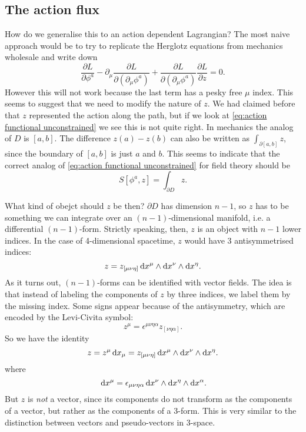 \documentclass[../main.tex]{subfiles}
\begin{document}
\subsection{The action flux}
How do we generalise this to an action dependent Lagrangian? The most naive approach would
be to try to replicate the Herglotz equations from mechanics wholesale and write down
\begin{equation*}
	\frac{\partial L}{\partial \phi^a} - \partial_\mu \frac{\partial L}{\partial
	(\partial_\mu \phi ^a)} + \frac{\partial L}{\partial(\partial_\mu \phi^a)}\frac{\partial
L}{\partial z} = 0. 
\end{equation*}
However this will not work because the last term has a pesky free \( \mu \) index. This
seems to suggest that we need to modify the nature of \( z \). We had claimed before that
\( z \) represented the action along the path, but if we look at \cref{eq:action
functional unconstrained} we see this is not quite right. In mechanics the analog of \( D
\) is \( [a,b] \). The difference \( z(a) - z(b) \) can also be written as \(
\int_{\partial [a,b]} z \), since the boundary of \( [a,b] \) is just \( a \) and \( b \).
This seems to indicate that the correct analog of \cref{eq:action functional
unconstrained} for field theory should be
\begin{equation*}
	S[\phi^a, z] = \int_{\partial D} z.
\end{equation*}

What kind of obejct should \( z \) be then? \( \partial D \) has dimension \( n-1 \), so
\( z \) has to be something we can integrate over an \( (n-1) \)-dimensional manifold,
i.e. a differential \( (n-1) \)-form. Strictly speaking, then, \( z \) is an object with
\( n-1 \) lower indices. In the case of 4-dimensional spacetime, \( z \) would have 3
antisymmetrised indices:
\begin{equation*} 
	z = z_{[\mu\nu\eta]} \,\mathrm{d} x^{\mu} \wedge \mathrm{d} x^\nu \wedge \mathrm{d} x^\eta.
\end{equation*}
As it turns out, \( (n-1) \)-forms can be identified with vector fields. The idea is that
instead of labeling the components of \( z \) by three indices, we label them by the
missing index. Some signs appear because of the antisymmetry, which are encoded by the
Levi-Civita symbol:
\begin{equation*}
	z^\mu = \epsilon^{\mu\nu\eta\alpha} z_{[\nu\eta\alpha]}. 
\end{equation*}
So we have the identity
\begin{equation*} 
	z = z^\mu \,\mathrm{d} x_\mu = z_{[\mu\nu\eta]} \,\mathrm{d} x^{\mu} \wedge \mathrm{d} x^\nu \wedge \mathrm{d} x^\eta.
\end{equation*}
where
\begin{equation*}
	\,\mathrm{d} x^\mu = \epsilon_{\mu\nu\eta\alpha} \,\mathrm{d} x^{\nu} \wedge \mathrm{d} x^\eta \wedge \mathrm{d} x^\alpha.
\end{equation*}
But \( z \) is \emph{not} a vector, since its components do not transform as the
components of a vector, but rather as the components of a 3-form. This is very similar to
the distinction between vectors and pseudo-vectors in 3-space. 
\end{document}
